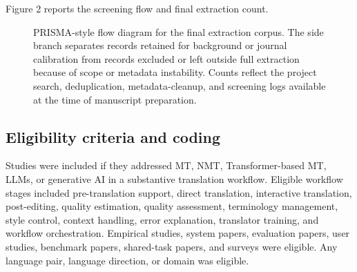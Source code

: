 \documentclass[11pt]{article}
\begin{document}
Figure 2 reports the screening flow and final extraction count.

\begin{figure}[t]
\centering
{}
\caption{PRISMA-style flow diagram for the final extraction corpus. The side branch separates records retained for background or journal calibration from records excluded or left outside full extraction because of scope or metadata instability. Counts reflect the project search, deduplication, metadata-cleanup, and screening logs available at the time of manuscript preparation.}
\end{figure}

\subsection{Eligibility criteria and coding}
Studies were included if they addressed MT, NMT, Transformer-based MT, LLMs, or generative AI in a substantive translation workflow. Eligible workflow stages included pre-translation support, direct translation, interactive translation, post-editing, quality estimation, quality assessment, terminology management, style control, context handling, error explanation, translator training, and workflow orchestration. Empirical studies, system papers, evaluation papers, user studies, benchmark papers, shared-task papers, and surveys were eligible. Any language pair, language direction, or domain was eligible.
\end{document}
